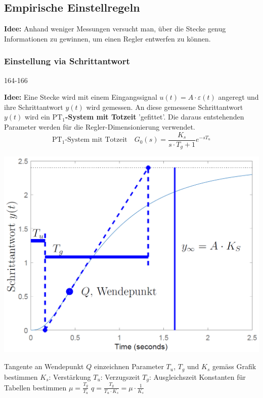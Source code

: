 \subsection{Empirische Einstellregeln}

\textbf{Idee:} Anhand weniger Messungen versucht man, über die Stecke genug Informationen zu gewinnen, um einen Regler entwerfen
zu können.


\subsubsection{Einstellung via Schrittantwort}{164-166}

\textbf{Idee:} Eine Stecke wird mit einem Eingangssignal $u(t) = A \cdot \varepsilon(t)$ angeregt und ihre 
Schrittantwort $y(t)$ wird gemessen. An diese gemessene Schrittantwort $y(t)$ wird ein \textbf{$\text{PT}_1$-System mit Totzeit}
'gefittet'. Die daraus entstehenden Parameter werden für die Regler-Dimensionierung verwendet.
$$ \text{PT}_1 \text{-System mit Totzeit} \quad G_0(s) = \frac{K_s}{s \cdot T_g + 1} e^{- s T_u} $$

\begin{minipage}[c]{0.45\columnwidth}
    \includegraphics[width=\columnwidth]{images/pid_regler_empirisch_einstellen.png}
\end{minipage}
\hfill
\begin{minipage}[c]{0.52\columnwidth}
    \begin{center}
        \textbf{}
    \end{center}

    \begin{outline}
        \1 Tangente an Wendepunkt $Q$ einzeichnen
        \1 Parameter $T_u$, $T_g$ und $K_s$ gemäss Grafik bestimmen
            \2 $K_s$: Verstärkung
            \2 $T_u$: Verzugszeit
            \2 $T_g$: Ausgleichszeit
        \1 Konstanten für Tabellen bestimmen
            \2 $\mu = \frac{T_g}{T_u}$
            \2 $q = \frac{T_g}{T_u \cdot K_s} = \mu \cdot \frac{1}{K_s}$
    \end{outline}
\end{minipage}

